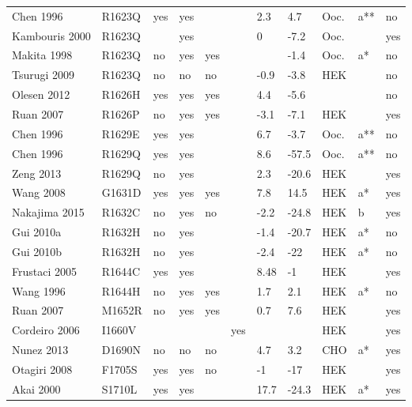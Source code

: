 \begin{tiny}
\begin{longtable}{p{4cm}|l|llll|ll|lll}
Chen 1996\cite{Chen1996MutationDB} & R1623Q & yes & yes &  &  & 2.3 & 4.7 & Ooc. & a** & no \\
Kambouris 2000\cite{Kambouris2000MutationDB} & R1623Q &  & yes &  &  & 0 & -7.2 & Ooc. &  & yes \\
Makita 1998\cite{Makita1998MutationDB} & R1623Q & no & yes & yes &  &  & -1.4 & Ooc. & a* & no \\
Tsurugi 2009\cite{Tsurugi2009MutationDB} & R1623Q & no & no & no &  & -0.9 & -3.8 & HEK &  & no \\
Olesen 2012\cite{Olesen2012MutationDB} & R1626H & yes & yes & yes &  & 4.4 & -5.6 &  &  & no \\
Ruan 2007\cite{Ruan2007MutationDB} & R1626P & no & yes & yes &  & -3.1 & -7.1 & HEK &  & yes \\
Chen 1996\cite{Chen1996MutationDB} & R1629E & yes & yes &  &  & 6.7 & -3.7 & Ooc. & a** & no \\
Chen 1996\cite{Chen1996MutationDB} & R1629Q & yes & yes &  &  & 8.6 & -57.5 & Ooc. & a** & no \\
Zeng 2013\cite{Zeng2013MutationDB} & R1629Q & no & yes &  &  & 2.3 & -20.6 & HEK &  & yes \\
Wang 2008\cite{Wang2008MutationDB} & G1631D & yes & yes & yes &  & 7.8 & 14.5 & HEK & a* & yes \\
Nakajima 2015\cite{Nakajima2015MutationDB} & R1632C & no & yes & no &  & -2.2 & -24.8 & HEK & b & yes \\
Gui 2010a\cite{Gui2010aMutationDB} & R1632H & no & yes &  &  & -1.4 & -20.7 & HEK & a* & no \\
Gui 2010b\cite{Gui2010bMutationDB} & R1632H & no & yes &  &  & -2.4 & -22 & HEK & a* & no \\
Frustaci 2005\cite{Frustaci2005MutationDB} & R1644C & yes & yes &  &  & 8.48 & -1 & HEK &  & yes \\
Wang 1996\cite{Wang1996MutationDB} & R1644H & no & yes & yes &  & 1.7 & 2.1 & HEK & a* & no \\
Ruan 2007\cite{Ruan2007MutationDB} & M1652R & no & yes & yes &  & 0.7 & 7.6 & HEK &  & yes \\
Cordeiro 2006\cite{Cordeiro2006MutationDB} & I1660V &  &  &  & yes &  &  & HEK &  & yes \\
Nunez 2013\cite{Nunez2013MutationDB} & D1690N & no & no & no &  & 4.7 & 3.2 & CHO & a* & yes \\
Otagiri 2008\cite{Otagiri2008MutationDB} & F1705S & yes & yes & no &  & -1 & -17 & HEK &  & yes \\
Akai 2000\cite{Akai2000MutationDB} & S1710L & yes & yes &  &  & 17.7 & -24.3 & HEK & a* & yes \\

\end{longtable}
\end{tiny}
